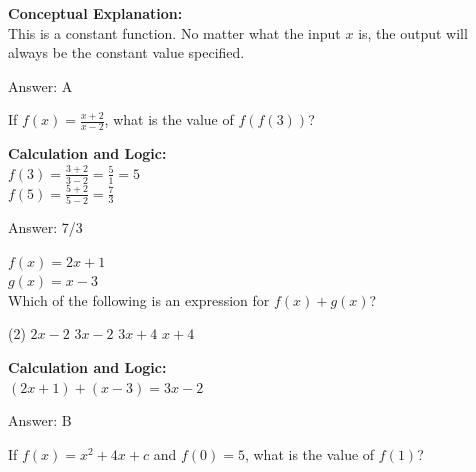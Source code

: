 \documentclass[11pt,paper=a4,answers]{exam}
\begin{document}
\begin{questions}
\begin{solution}
\textbf{Conceptual Explanation:} \\
This is a constant function. No matter what the input $x$ is, the output will always be the constant value specified.

\vspace{30pt}

Answer: \colorbox{yellow!100}{A}
\end{solution}

\vspace{40pt}

\question
If $f(x) = \frac{x+2}{x-2}$, what is the value of $f(f(3))$?

\begin{solution}
\textbf{Calculation and Logic:} \\
$f(3) = \frac{3+2}{3-2} = \frac{5}{1} = 5$ \\
$f(5) = \frac{5+2}{5-2} = \frac{7}{3}$

\vspace{30pt}

Answer: \colorbox{yellow!100}{7/3}
\end{solution}

\vspace{40pt}

\question
$f(x) = 2x + 1$ \\
$g(x) = x - 3$ \\
Which of the following is an expression for $f(x) + g(x)$?
\begin{tasks}(2)
    \task $2x - 2$
    \task $3x - 2$
    \task $3x + 4$
    \task $x + 4$
\end{tasks}

\begin{solution}
\textbf{Calculation and Logic:} \\
$(2x + 1) + (x - 3) = 3x - 2$

\vspace{30pt}

Answer: \colorbox{yellow!100}{B}
\end{solution}

\vspace{40pt}

\question
If $f(x) = x^2 + 4x + c$ and $f(0) = 5$, what is the value of $f(1)$?


\end{questions}
\end{document}
